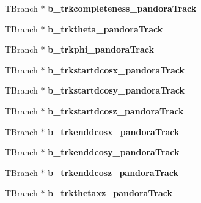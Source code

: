 \begin{DoxyCompactItemize}
\item 
\hypertarget{classanatree_adec982c55072c93c49201fd47c0b8025}{T\-Branch $\ast$ {\bfseries b\-\_\-trkcompleteness\-\_\-pandora\-Track}}\label{classanatree_adec982c55072c93c49201fd47c0b8025}

\item 
\hypertarget{classanatree_a869e4f8b2b677a8346b211c6690555db}{T\-Branch $\ast$ {\bfseries b\-\_\-trktheta\-\_\-pandora\-Track}}\label{classanatree_a869e4f8b2b677a8346b211c6690555db}

\item 
\hypertarget{classanatree_a82f05bdd37129948f382b46359c63579}{T\-Branch $\ast$ {\bfseries b\-\_\-trkphi\-\_\-pandora\-Track}}\label{classanatree_a82f05bdd37129948f382b46359c63579}

\item 
\hypertarget{classanatree_a38c205267ecbb57908995438749b43ed}{T\-Branch $\ast$ {\bfseries b\-\_\-trkstartdcosx\-\_\-pandora\-Track}}\label{classanatree_a38c205267ecbb57908995438749b43ed}

\item 
\hypertarget{classanatree_aea07ba810413c75c05c22d16e222c000}{T\-Branch $\ast$ {\bfseries b\-\_\-trkstartdcosy\-\_\-pandora\-Track}}\label{classanatree_aea07ba810413c75c05c22d16e222c000}

\item 
\hypertarget{classanatree_a36feb3589817a5bd0431cade34ece996}{T\-Branch $\ast$ {\bfseries b\-\_\-trkstartdcosz\-\_\-pandora\-Track}}\label{classanatree_a36feb3589817a5bd0431cade34ece996}

\item 
\hypertarget{classanatree_a35f18863079da3510c2b203cb0dc63a0}{T\-Branch $\ast$ {\bfseries b\-\_\-trkenddcosx\-\_\-pandora\-Track}}\label{classanatree_a35f18863079da3510c2b203cb0dc63a0}

\item 
\hypertarget{classanatree_abdbaf3a2673795d79336932b27046308}{T\-Branch $\ast$ {\bfseries b\-\_\-trkenddcosy\-\_\-pandora\-Track}}\label{classanatree_abdbaf3a2673795d79336932b27046308}

\item 
\hypertarget{classanatree_aa92df6504e77bb1b812f64a92fa60c45}{T\-Branch $\ast$ {\bfseries b\-\_\-trkenddcosz\-\_\-pandora\-Track}}\label{classanatree_aa92df6504e77bb1b812f64a92fa60c45}

\item 
\hypertarget{classanatree_af7cf0dc9b50e153a03e509ceeb580e5c}{T\-Branch $\ast$ {\bfseries b\-\_\-trkthetaxz\-\_\-pandora\-Track}}\label{classanatree_af7cf0dc9b50e153a03e509ceeb580e5c}


\end{DoxyCompactItemize}

